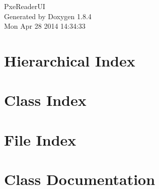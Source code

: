 \documentclass[twoside]{book}
\newcommand{\clearemptydoublepage}{%
  \newpage{\pagestyle{empty}\cleardoublepage}%
}
\begin{document}
\hypersetup{pageanchor=false}
\begin{titlepage}
\vspace*{7cm}
\begin{center}%
{\Large Pxe\-Reader\-U\-I }\\
\vspace*{1cm}
{\large Generated by Doxygen 1.8.4}\\
\vspace*{0.5cm}
{\small Mon Apr 28 2014 14:34:33}\\
\end{center}
\end{titlepage}
\clearemptydoublepage
\tableofcontents
\clearemptydoublepage
{}
\hypersetup{pageanchor=true}

\chapter{Hierarchical Index}

\chapter{Class Index}

\chapter{File Index}

\chapter{Class Documentation}
































\end{document}
